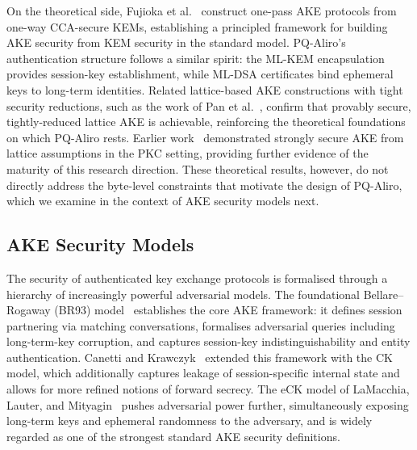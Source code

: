 On the theoretical side, Fujioka et al.~\cite{ASIACCS:FSXY13} construct
one-pass AKE protocols from one-way CCA-secure KEMs, establishing a principled
framework for building AKE security from KEM security in the standard model.
PQ-Aliro's authentication structure follows a similar spirit: the ML-KEM
encapsulation provides session-key establishment, while ML-DSA certificates
bind ephemeral keys to long-term identities.
Related lattice-based AKE constructions with tight security reductions, such as
the work of Pan et al.~\cite{C:PanWagZen23}, confirm that provably secure,
tightly-reduced lattice AKE is achievable, reinforcing the theoretical
foundations on which PQ-Aliro rests.
Earlier work~\cite{PKC:FSXY12} demonstrated strongly secure AKE from lattice
assumptions in the PKC setting, providing further evidence of the maturity of
this research direction.
These theoretical results, however, do not directly address the byte-level
constraints that motivate the design of PQ-Aliro, which we examine in the
context of AKE security models next.

\subsection{AKE Security Models}
\label{sec:related:models}

The security of authenticated key exchange protocols is formalised through a
hierarchy of increasingly powerful adversarial models.
The foundational Bellare--Rogaway (BR93) model~\cite{C:BelRog93} establishes
the core AKE framework: it defines session partnering via matching
conversations, formalises adversarial queries including long-term-key
corruption, and captures session-key indistinguishability and entity
authentication.
Canetti and Krawczyk~\cite{EC:CanKra01} extended this framework with the CK
model, which additionally captures leakage of session-specific internal state
and allows for more refined notions of forward secrecy.
The eCK model of LaMacchia, Lauter, and Mityagin~\cite{PROVSEC:LaMLauMit07}
pushes adversarial power further, simultaneously exposing long-term keys and
ephemeral randomness to the adversary, and is widely regarded as one of the
strongest standard AKE security definitions.


